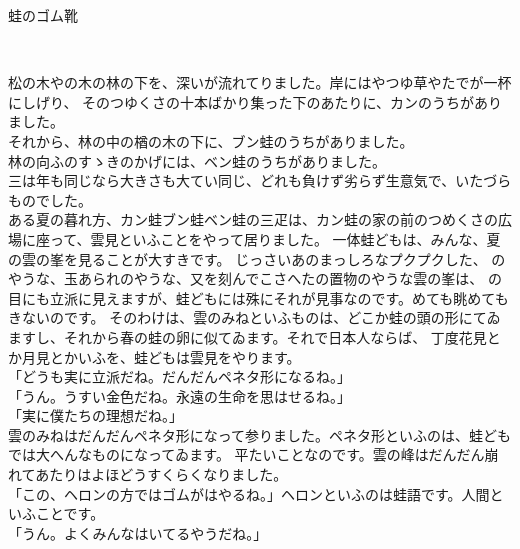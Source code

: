 \documentclass[
a4paper,
10pt,
book]
{tarticle}
\begin{document}
\Large

\thispagestyle{empty}
{\fontsize{30pt}{24pt}\selectfont
蛙のゴム靴\\
\begin{flushright}
\\
\end{flushright}
}
\newpage
\pagewiselinenumbers
\setcounter{page}{2}

\indent 松の木やの木の林の下を、深いが流れてりました。岸にはやつゆ草やたでが一杯にしげり、
そのつゆくさの十本ばかり集った下のあたりに、カンのうちがありました。\\
\indent それから、林の中の楢の木の下に、ブン蛙のうちがありました。\\
\indent 林の向ふのすゝきのかげには、ベン蛙のうちがありました。\\
\indent 三は年も同じなら大きさも大てい同じ、どれも負けず劣らず生意気で、いたづらものでした。\\
\indent ある夏の暮れ方、カン蛙ブン蛙ベン蛙の三疋は、カン蛙の家の前のつめくさの広場に座って、雲見といふことをやって居りました。
一体蛙どもは、みんな、夏の雲の峯を見ることが大すきです。
じっさいあのまっしろなプクプクした、
のやうな、玉あられのやうな、又を刻んでこさへたの置物のやうな雲の峯は、
の目にも立派に見えますが、蛙どもには殊にそれが見事なのです。めても眺めてもきないのです。
そのわけは、雲のみねといふものは、どこか蛙の頭の形にてゐますし、それから春の蛙の卵に似てゐます。それで日本人ならば、
丁度花見とか月見とかいふを、蛙どもは雲見をやります。\\
「どうも実に立派だね。だんだんペネタ形になるね。」\\
「うん。うすい金色だね。永遠の生命を思はせるね。」\\
「実に僕たちの理想だね。」\\
\indent 雲のみねはだんだんペネタ形になって参りました。ペネタ形といふのは、蛙どもでは大へんなものになってゐます。
平たいことなのです。雲の峰はだんだん崩れてあたりはよほどうすくらくなりました。\\
「この、ヘロンの方ではゴムがはやるね。」ヘロンといふのは蛙語です。人間といふことです。\\
「うん。よくみんなはいてるやうだね。」
\end{document}
